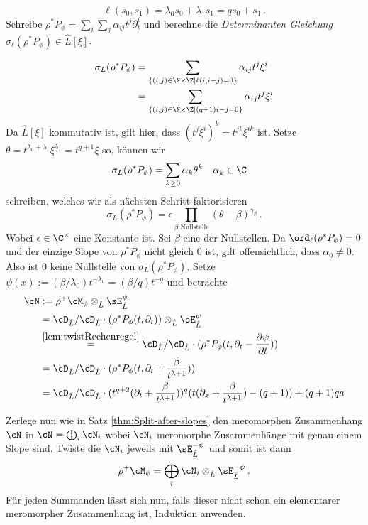 \[
\ell(s_0,s_1)=\lambda_0s_0+\lambda_1s_1=qs_0+s_1 \,.
\]
Schreibe $\rho^*P_{\phi}=\sum_i\sum_j\alpha_{ij}t^j\partial_t^i$ und berechne
die \emph{Determinanten Gleichung} $\sigma_\ell(\rho^*P_{\phi})\in \hat L[\xi]$.
\begin{comment}
Schon gezeigt, das $ord_\ell = 0$?
\end{comment}
\begin{align*}
\sigma_L(\rho^*P_{\phi})
  &= \sum_{\{(i,j)\in\N\times\Z \mid \ell(i,i-j)=0\}}\alpha_{ij}t^j\xi^i\\
  &= \sum_{\{(i,j)\in\N\times\Z \mid (q+1)i-j=0\}}\alpha_{ij}t^j\xi^i
\end{align*}
Da $\hat L[\xi]$ kommutativ ist, gilt hier, dass $(t^j\xi^i)^k=t^{jk}\xi^{ik}$
ist.  Setze $\theta=t^{\lambda_0+\lambda_1}\xi^{\lambda_1}=t^{q+1}\xi$ so,
können wir
\begin{align*}
\sigma_L(\rho^*P_{\phi}) &= \sum_{k\geq 0}\alpha_k\theta^k & & \alpha_k\in\C
\end{align*}
schreiben, welches wir als nächsten Schritt faktorisieren
\[
\sigma_L(\rho^*P_\phi)
  =\epsilon\prod_{\beta\mbox{ Nullstelle}}(\theta-\beta)^{\gamma_\beta}\,.
\]
Wobei $\epsilon\in\C^\times$ eine Konstante ist.
Sei $\beta$  eine der Nullstellen.
Da $\ord_\ell(\rho^*P_\phi)=0$ und der einzige Slope von $\rho^*P_\phi$ nicht
gleich $0$ ist, gilt offensichtlich, dass $\alpha_0\neq0$. Also ist $0$ keine
Nullstelle von $\sigma_L(\rho^*P_\phi)$.
Setze $\psi(x):=(\beta/\lambda_0)t^{-\lambda_0}=(\beta/q)t^{-q}$ und
betrachte
\begin{align*}
\cN&:=\rho^+\cM_\phi\otimes_{\hat L}\sE_{\hat L}^\psi
\\&= \cD_{\hat L}/\cD_{\hat L}\cdot(\rho^*P_{\phi}(t,\partial_t))
    \otimes_{\hat L}\sE_{\hat L}^\psi
\\&\overset{\ref{lem:twistRechenregel}}{=}
  \cD_{\hat L}/\cD_{\hat L}\cdot(\rho^*P_{\phi}(t,\partial_t-\frac{\partial
  \psi}{\partial t}))
\\&=\cD_{\hat L}/\cD_{\hat
    L}\cdot(\rho^*P_{\phi}(t,\partial_t+\frac{\beta}{t^{\lambda+1}}))
\\&=\cD_{\hat L}/\cD_{\hat L}\cdot
    (t^{q+2}(\partial_t+\frac{\beta}{t^{\lambda+1}}))^{q}
    (t(\partial_x+\frac{\beta}{t^{\lambda+1}})-(q+1))+(q+1)qa
\end{align*}
\begin{comment}
TODO: hier weiter vereinfachen
\end{comment}
Zerlege nun wie in  Satz \ref{thm:Split-after-slopes} den meromorphen
Zusammenhang $\cN$ in $\cN=\bigoplus_i\cN_i$ wobei $\cN_i$ meromorphe
Zusammenhänge mit genau einem Slope sind.
Twiste die $\cN_i$ jeweils mit $\sE^{-\psi}_{\hat L}$ und somit ist dann
\[
\rho^+\cM_{\phi}=\bigoplus_i\cN_i\otimes_{\hat L}\sE^{-\psi}_{\hat L} \,.
\]
Für jeden Summanden lässt sich nun, falls dieser nicht schon ein elementarer
meromorpher Zusammenhang ist, Induktion anwenden.
\begin{comment}
nicht elementar, sondern regulär otimes E
\end{comment}


